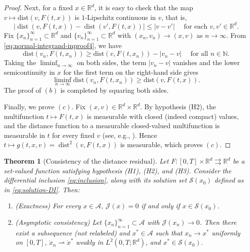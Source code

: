 \documentclass[11pt]{elsarticle}
\newtheorem{theorem}{Theorem}[section]
\theoremstyle{definition}
\theoremstyle{remark}
\numberwithin{equation}{section}
\def\dist{\operatorname{dist}}
\begin{document}
\begin{proof}
		Next, for a fixed $x\in\mathbb{R}^d$, it is easy to check that the map $v \mapsto \text{dist}(v, F(t, x))$ is $1$-Lipschitz continuous in $v$, that is,
		\begin{equation}\label{eq:normal-integrand-inproof4}
			|\dist(v, F(t,x)) - \dist(v', F(t,x))| \le |v - v'|
			\quad \text{ for each } v,v'\in\mathbb{R}^d.
		\end{equation}
		Fix $\{x_n\}_{n=1}^{\infty}\subset\mathbb{R}^d$
		and $\{v_n\}_{n=1}^{\infty}\subset\mathbb{R}^d$
		with $(x_n, v_n) \rightarrow (x, v)$ as $n \rightarrow \infty.$ From \eqref{eq:normal-integrand-inproof4}, we have
		\begin{equation}
			\text{dist}(v_n, F(t, x_n)) \ge \text{dist}(v, F(t, x_n)) - |v_n - v| \quad \text{ for all } n\in\mathbb{N}.
		\end{equation}
		Taking the $\liminf_{n \rightarrow \infty}$ on both sides, the term $|v_n - v|$ vanishes and the lower semicontinuity in $x$ for the first term on the right-hand side gives
		\begin{equation}
			\liminf_{n \rightarrow \infty} \text{dist}(v_n, F(t, x_n)) \ge \text{dist}(v, F(t, x)).
		\end{equation}
		The proof of $(b)$ is completed by squaring both sides.
		
		Finally, we prove $(c)$. Fix $(x,v)\in\mathbb{R}^d\times\mathbb{R}^d$.
		By hypothesis (H2), the multifunction $t\mapsto F(t,x)$ is measurable
		with closed (indeed compact) values, and the distance function to a
		measurable closed-valued multifunction is measurable in $t$ for every
		fixed $v$ (see, e.g., \cite[Chapter~8]{aubin_frankowska_2009}). Hence
		$t\mapsto g(t,x,v)=\dist^2(v,F(t,x))$ is measurable, which proves
		$(c)$.
	\end{proof}
	
	
	\begin{theorem}[Consistency of the distance residual] \label{thm:consistency}
		Let $F:[0,T]\times\mathbb{R}^d\rightrightarrows\mathbb{R}^d$ be a set-valued function satisfying hypothesis \textup{(H1)}, \textup{(H2)}, and \textup{(H3)}.
		Consider the differential inclusion \eqref{eq:inclusion}, along with its
		solution set $\mathcal{S}(x_0)$ defined as in \eqref{eq:solution-DI}.
		Then:
		\begin{enumerate}
			\item[\rm(a)] (Exactness) For every $x \in \mathcal{A}$, $\mathcal{J}(x) = 0$ if and only if $x \in \mathcal{S}(x_0)$.
			\item[\rm(b)] (Asymptotic consistency) Let $\{x_n\}_{n=1}^{\infty} \subset \mathcal{A}$ with $\mathcal{J}(x_n) \to 0$. Then there exist a subsequence (not relabeled) and $x^* \in \mathcal{A}$ such that $x_n \to x^*$ uniformly on $[0,T]$, $\dot{x}_n \rightharpoonup \dot{x}^*$ weakly in $L^2(0,T; \mathbb{R}^d)$, and $x^* \in \mathcal{S}(x_0)$.
		\end{enumerate}
	\end{theorem}
	
\end{document}
